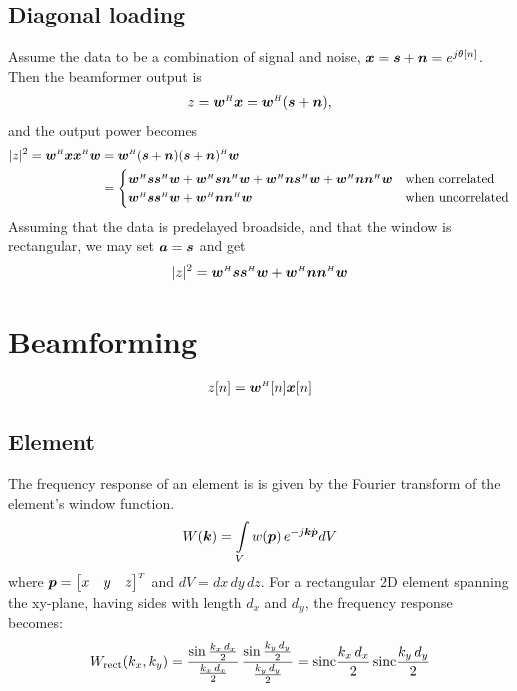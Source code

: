 \subsection{Diagonal loading}

Assume the data to be a combination of signal and noise, $\x = \s + \n = e^{j\theta[n]}$. Then the beamformer output is
%
\begin{align}
z = \w\H\x = \w\H(\s+\n),
\end{align}
%
and the output power becomes
%
\begin{align}
|z|^2 = \w\H\x\x\H\w &= \w\H(\s+\n)(\s+\n)\H\w \nn
&= \begin{cases}
\w\H\s\s\H\w + \w\H\s\n\H\w + \w\H\n\s\H\w + \w\H\n\n\H\w &\text{when correlated}\\
\w\H\s\s\H\w + \w\H\n\n\H\w &\text{when uncorrelated}
\end{cases}
\end{align}
%
Assuming that the data is predelayed broadside, and that the window is rectangular, we may set $\a = \s$ and get
%
\begin{align}
|z|^2 = \w\H\s\s\H\w + \w\H\n\n\H\w
\end{align}


\newpage
\section{Beamforming}



\begin{align}
z[n] = \w\H[n]\x[n]
\end{align}




\subsection{Element}

The frequency response of an element is is given by the Fourier transform of the element's window function.
%
\begin{align}
W(\k) = \int\limits_{V} w(\p)\,e^{-j\k\dot\p} dV
\end{align}
%
where $\p = \bmat{x & y & z}\T$ and $dV = dx\,dy\,dz$. For a rectangular 2D element spanning the xy-plane, having sides with length $d_x$ and $d_y$, the frequency response becomes:
%
\begin{align}
W_\text{rect}(k_x, k_y) = \frac{\sin\frac{k_x\,d_x}{2}}{\frac{k_x\,d_x}{2}}\,\frac{\sin\frac{k_y\,d_y}{2}}{\frac{k_y\,d_y}{2}} = \sinc\frac{k_x\,d_x}{2}\,\sinc\frac{k_y\,d_y}{2}
\end{align}

